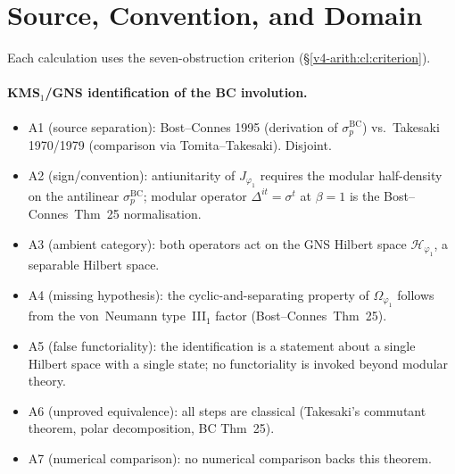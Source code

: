 \section{Source, Convention, and Domain}
\label{v4-arith:kms-gns:verification}

Each calculation uses the seven-obstruction criterion
(\S\ref{v4-arith:cl:criterion}).

\paragraph{KMS\({}_{1}\)/GNS identification of the BC involution.}
\begin{itemize}
\item A1 (source separation): Bost--Connes 1995 (derivation of
\(\sigma^{\mathrm{BC}}_{p}\)) vs.~Takesaki 1970/1979 (comparison via
Tomita--Takesaki). Disjoint.
\item A2 (sign/convention): antiunitarity of \(J_{\varphi_{1}}\)
requires the modular half-density on the antilinear
\(\sigma^{\mathrm{BC}}_{p}\); modular
operator \(\Delta^{it}=\sigma^{t}\) at \(\beta=1\) is the
Bost--Connes~Thm~25 normalisation.
\item A3 (ambient category): both operators act on the GNS Hilbert
space \(\mathcal{H}_{\varphi_{1}}\), a separable Hilbert space.
\item A4 (missing hypothesis): the cyclic-and-separating property
of \(\Omega_{\varphi_{1}}\) follows from the von~Neumann type~III\({}_{1}\)
factor (Bost--Connes~Thm~25).
\item A5 (false functoriality): the identification is a statement
about a single Hilbert space with a single state; no functoriality
is invoked beyond modular theory.
\item A6 (unproved equivalence): all steps are classical (Takesaki's
commutant theorem, polar decomposition, BC Thm~25).
\item A7 (numerical comparison): no numerical comparison backs this theorem.
\end{itemize}

